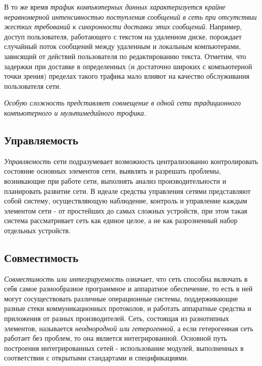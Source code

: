 В то же время \emph{трафик компьютерных данных характеризуется крайне неравномерной интенсивностью поступления сообщений в сеть при отсутствии жестких требований к синхронности доставки этих сообщений}.
Например, доступ пользователя, работающего с текстом на удаленном диске, порождает случайный поток сообщений между удаленным и локальным компьютерами, зависящий от действий пользователя по редактированию текста.
Отметим, что задержки при доставке в определенных (и достаточно широких с компьютерной точки зрения) пределах такого трафика мало влияют на качество обслуживания пользователя сети.

\emph{Особую сложность представляет совмещение в одной сети традиционного компьютерного и мультимедийного трофика.}

\subsection{Управляемость}
\emph{Управляемость} сети подразумевает возможность централизованно контролировать состояние основных элементов сети, выявлять и разрешать проблемы, возникающие при работе сети, выполнять анализ производительности и планировать развитие сети.
В идеале средства управления сетями представляют собой систему, осуществляющую наблюдение, контроль и управление каждым элементом сети - от простейших до самых сложных устройств, при этом такая система рассматривает сеть как единое целое, а не как разрозненный набор отдельных устройств.

\subsection{Совместимость}
\emph{Совместимость или интегрируемость} означает, что сеть способна включать в себя самое разнообразное программное и аппаратное обеспечение, то есть в ней могут сосуществовать различные операционные системы, поддерживающие разные стеки коммуникационных протоколов, и работать аппаратные средства и приложения от разных производителей.
Сеть, состоящая из разнотипных элементов, называется \emph{неоднородной или гетерогенной}, а если гетерогенная сеть работает без проблем, то она является интегрированной.
Основной путь построения интегрированных сетей - использование модулей, выполненных в соответствии с открытыми стандартами и спецификациями.
